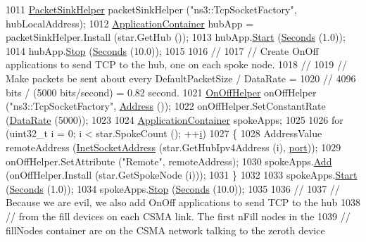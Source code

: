 \begin{DoxyCode}
1011   \hyperlink{classns3_1_1PacketSinkHelper}{PacketSinkHelper} packetSinkHelper (\textcolor{stringliteral}{"ns3::TcpSocketFactory"}, hubLocalAddress);
1012   \hyperlink{classns3_1_1ApplicationContainer}{ApplicationContainer} hubApp = packetSinkHelper.Install (star.GetHub ());
1013   hubApp.\hyperlink{classns3_1_1ApplicationContainer_a8eff87926507020bbe3e1390358a54a7}{Start} (\hyperlink{group__timecivil_ga33c34b816f8ff6628e33d5c8e9713b9e}{Seconds} (1.0));
1014   hubApp.\hyperlink{classns3_1_1ApplicationContainer_adfc52f9aa4020c8714679b00bbb9ddb3}{Stop} (\hyperlink{group__timecivil_ga33c34b816f8ff6628e33d5c8e9713b9e}{Seconds} (10.0));
1015 
1016   \textcolor{comment}{//}
1017   \textcolor{comment}{// Create OnOff applications to send TCP to the hub, one on each spoke node.}
1018   \textcolor{comment}{//}
1019   \textcolor{comment}{// Make packets be sent about every DefaultPacketSize / DataRate = }
1020   \textcolor{comment}{// 4096 bits / (5000 bits/second) = 0.82 second.}
1021   \hyperlink{classns3_1_1OnOffHelper}{OnOffHelper} onOffHelper (\textcolor{stringliteral}{"ns3::TcpSocketFactory"}, \hyperlink{classns3_1_1Address}{Address} ());
1022   onOffHelper.SetConstantRate (\hyperlink{classns3_1_1DataRate}{DataRate} (5000));
1023 
1024   \hyperlink{classns3_1_1ApplicationContainer}{ApplicationContainer} spokeApps;
1025 
1026   \textcolor{keywordflow}{for} (uint32\_t i = 0; i < star.SpokeCount (); ++\hyperlink{bernuolliDistribution_8m_a6f6ccfcf58b31cb6412107d9d5281426}{i})
1027     \{
1028       AddressValue remoteAddress (\hyperlink{classns3_1_1InetSocketAddress}{InetSocketAddress} (star.GetHubIpv4Address (i), 
      \hyperlink{dsdv-manet_8cc_a8e0798404bf2cf5dabb84c5ba9a4f236}{port}));
1029       onOffHelper.SetAttribute (\textcolor{stringliteral}{"Remote"}, remoteAddress);
1030       spokeApps.\hyperlink{classns3_1_1ApplicationContainer_ad09ab1a1ad5849d518d5f4c262e38152}{Add} (onOffHelper.Install (star.GetSpokeNode (i)));
1031     \}
1032 
1033   spokeApps.\hyperlink{classns3_1_1ApplicationContainer_a8eff87926507020bbe3e1390358a54a7}{Start} (\hyperlink{group__timecivil_ga33c34b816f8ff6628e33d5c8e9713b9e}{Seconds} (1.0));
1034   spokeApps.\hyperlink{classns3_1_1ApplicationContainer_adfc52f9aa4020c8714679b00bbb9ddb3}{Stop} (\hyperlink{group__timecivil_ga33c34b816f8ff6628e33d5c8e9713b9e}{Seconds} (10.0));
1035 
1036   \textcolor{comment}{//}
1037   \textcolor{comment}{// Because we are evil, we also add OnOff applications to send TCP to the hub }
1038   \textcolor{comment}{// from the fill devices on each CSMA link.  The first nFill nodes in the }
1039   \textcolor{comment}{// fillNodes container are on the CSMA network talking to the zeroth device}

\end{DoxyCode}

